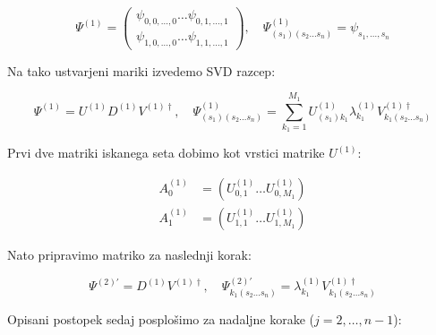 \documentclass[a4paper]{article}
\newcommand{\range}[2]{#1, \ldots, #2}
\newcommand{\seq}[2]{#1 \ldots #2}
\newcommand{\psiCoef}[2]{\psi_{\range{#1}{#2}}}
\newcommand{\psiCoeff}[3]{\psi_{#1, \range{#2}{#3}}}
\begin{document}
    \begin{equation}\label{eq4}
        \Psi^{(1)} = \begin{pmatrix} \seq{\psiCoeff{0}{0}{0}}{\psiCoeff{0}{1}{1}} \\ \seq{\psiCoeff{1}{0}{0}}{\psiCoeff{1}{1}{1}} \end{pmatrix},
            \quad \Psi^{(1)}_{(s_1)(\seq{s_2}{s_n})} = \psiCoef{s_1}{s_n}
    \end{equation}

    Na tako ustvarjeni mariki izvedemo SVD razcep:

    \begin{equation}\label{eq5}
        \Psi^{(1)} = U^{(1)} D^{(1)} V^{(1)\dagger},
            \quad \Psi^{(1)}_{(s_1)(\seq{s_2}{s_n})} = \sum_{k_1=1}^{M_1} U^{(1)}_{(s_1)k_1} \lambda^{(1)}_{k_1} V^{(1)\dagger}_{k_1(\seq{s_2}{s_n})}
    \end{equation}

    Prvi dve matriki iskanega seta dobimo kot vrstici matrike $U^{(1)}$:

    \begin{equation}\label{eq6}
        \begin{split}
            A^{(1)}_0 &= \left( \seq{U^{(1)}_{0, 1}}{U^{(1)}_{0, M_1}} \right) \\
            A^{(1)}_1 &= \left( \seq{U^{(1)}_{1, 1}}{U^{(1)}_{1, M_1}} \right)
        \end{split}
    \end{equation}

    Nato pripravimo matriko za naslednji korak:

    \begin{equation}\label{eq7}
        \Psi^{(2)\prime} = D^{(1)} V^{(1)\dagger},
            \quad \Psi^{(2)\prime}_{k_1(\seq{s_2}{s_n})} = \lambda^{(1)}_{k_1} V^{(1)\dagger}_{k_1(\seq{s_2}{s_n})}
    \end{equation}

    Opisani postopek sedaj posplošimo za nadaljne korake ($j = \range{2}{n - 1}$):
\end{document}
